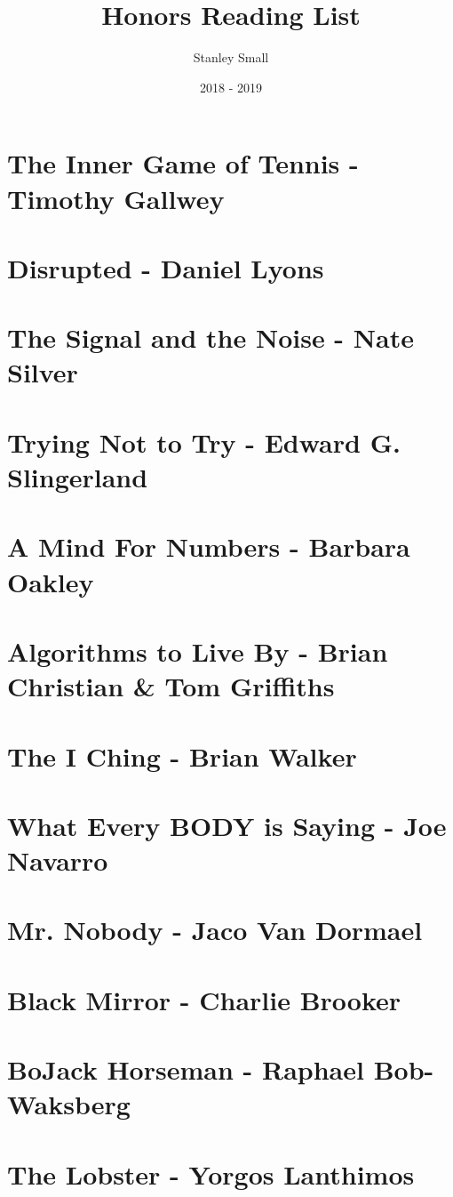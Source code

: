 \documentclass{article}
\title{Honors Reading List}
\author{Stanley Small}
\date{2018 - 2019}
\begin{document}
\begin{titlepage}
\maketitle
\tableofcontents
\thispagestyle{empty}
\end{titlepage}

\newpage
\section{The Inner Game of Tennis - Timothy Gallwey}
\newpage
\section{Disrupted - Daniel Lyons}
\newpage
\section{The Signal and the Noise - Nate Silver}
\newpage
\section{Trying Not to Try - Edward G. Slingerland}
\newpage
\section{A Mind For Numbers - Barbara Oakley}
\newpage
\section{Algorithms to Live By - Brian Christian \& Tom Griffiths}
\newpage
\section{The I Ching - Brian Walker}
\newpage
\section{What Every BODY is Saying - Joe Navarro}
\newpage
\section{Mr. Nobody - Jaco Van Dormael}
\newpage
\section{Black Mirror - Charlie Brooker}
\newpage
\section{BoJack Horseman - Raphael Bob-Waksberg}
\newpage
\section{The Lobster - Yorgos Lanthimos}
\end{document}
